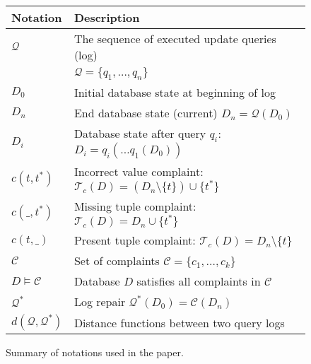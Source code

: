 
\begin{figure}[t]
\centering
{\small
\begin{tabular}{ll}
    \toprule
    \textbf{Notation} & \textbf{Description}\\
    \midrule
    $\mathcal{Q}$& The sequence of executed update queries (log)\\ 
             & $\mathcal{Q}=\{q_1, \dots, q_n\}$ \\
    $D_0$    & Initial database state at beginning of log\\
    $D_n$    & End database state (current) $D_n=\mathcal{Q}(D_0)$\\
    $D_i$    & Database state after query $q_i$: $D_i=q_i(\dots q_1(D_0))$\\
    $c(t,t^*)$ & Incorrect value complaint: $\mathcal{T}_c(D) = (D_n\setminus\{t\})\cup\{t^*\}$\\
    $c(\_,t^*)$ & Missing tuple complaint: $\mathcal{T}_c(D) = D_n\cup\{t^*\}$\\
    $c(t,\_)$ & Present tuple complaint: $\mathcal{T}_c(D) = D_n\setminus\{t\}$\\
    $\mathcal{C}$ & Set of complaints $\mathcal{C}=\{c_1,\dots,c_k\}$\\
    $D\models\mathcal{C}$   & Database $D$ satisfies all complaints in $\mathcal{C}$\\
    $\mathcal{Q}^*$& Log repair $\mathcal{Q}^*(D_0)=\mathcal{C}(D_n)$\\
    $d(\mathcal{Q}, \mathcal{Q}^*)$ & Distance functions between two query logs\\
    \bottomrule
\end{tabular}
}
\caption{Summary of notations used in the paper.}
\label{tbl:notation}
\end{figure}